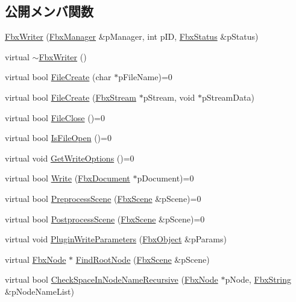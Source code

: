 \subsection*{公開メンバ関数}
\begin{DoxyCompactItemize}
\item 
\hyperlink{class_fbx_writer_ac33ec77f3dce1ab1b25eeb5dda1efbeb}{Fbx\+Writer} (\hyperlink{class_fbx_manager}{Fbx\+Manager} \&p\+Manager, int p\+ID, \hyperlink{class_fbx_status}{Fbx\+Status} \&p\+Status)
\item 
virtual \hyperlink{class_fbx_writer_a4b6ae3b6648c00ec98e4ff62fb0383b0}{$\sim$\+Fbx\+Writer} ()
\item 
virtual bool \hyperlink{class_fbx_writer_abe6729227cd6e3be5ee3ab0c1b8b0eda}{File\+Create} (char $\ast$p\+File\+Name)=0
\item 
virtual bool \hyperlink{class_fbx_writer_a9b64b6230b05e64a83b78b36d1667da7}{File\+Create} (\hyperlink{class_fbx_stream}{Fbx\+Stream} $\ast$p\+Stream, void $\ast$p\+Stream\+Data)
\item 
virtual bool \hyperlink{class_fbx_writer_a0387142f55d0020fd5360759c12aa121}{File\+Close} ()=0
\item 
virtual bool \hyperlink{class_fbx_writer_ab70be3aaebd304af11cdce5e225cce68}{Is\+File\+Open} ()=0
\item 
virtual void \hyperlink{class_fbx_writer_ad237f5cd183ae29f744aee32b7aa5525}{Get\+Write\+Options} ()=0
\item 
virtual bool \hyperlink{class_fbx_writer_aa8c0277611da0fdb0b9a184c55c30c2c}{Write} (\hyperlink{class_fbx_document}{Fbx\+Document} $\ast$p\+Document)=0
\item 
virtual bool \hyperlink{class_fbx_writer_a0fd62ec785e7108924975591ee8fbf30}{Preprocess\+Scene} (\hyperlink{class_fbx_scene}{Fbx\+Scene} \&p\+Scene)=0
\item 
virtual bool \hyperlink{class_fbx_writer_a1cfdf59f72ebe777484862e4b64b5d65}{Postprocess\+Scene} (\hyperlink{class_fbx_scene}{Fbx\+Scene} \&p\+Scene)=0
\item 
virtual void \hyperlink{class_fbx_writer_a851219ad904ebdce34acd3b8699cb0c8}{Plugin\+Write\+Parameters} (\hyperlink{class_fbx_object}{Fbx\+Object} \&p\+Params)
\item 
virtual \hyperlink{class_fbx_node}{Fbx\+Node} $\ast$ \hyperlink{class_fbx_writer_a51598448b60263516ac4da1a24deaa2a}{Find\+Root\+Node} (\hyperlink{class_fbx_scene}{Fbx\+Scene} \&p\+Scene)
\item 
virtual bool \hyperlink{class_fbx_writer_a9db05cf879a056dce01c960559cee27b}{Check\+Space\+In\+Node\+Name\+Recursive} (\hyperlink{class_fbx_node}{Fbx\+Node} $\ast$p\+Node, \hyperlink{class_fbx_string}{Fbx\+String} \&p\+Node\+Name\+List)

\end{DoxyCompactItemize}

